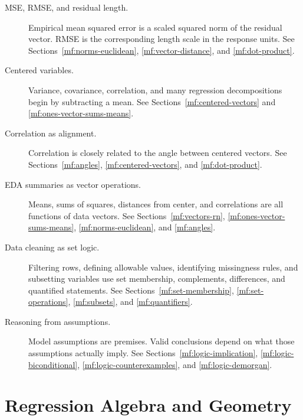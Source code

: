 \begin{description}
    \item[MSE, RMSE, and residual length.] Empirical mean squared error is a scaled squared norm of the residual vector. RMSE is the corresponding length scale in the response units. See Sections~\ref{mf:norms-euclidean}, \ref{mf:vector-distance}, and \ref{mf:dot-product}.

    \item[Centered variables.] Variance, covariance, correlation, and many regression decompositions begin by subtracting a mean. See Sections~\ref{mf:centered-vectors} and \ref{mf:ones-vector-sums-means}.

    \item[Correlation as alignment.] Correlation is closely related to the angle between centered vectors. See Sections~\ref{mf:angles}, \ref{mf:centered-vectors}, and \ref{mf:dot-product}.

    \item[EDA summaries as vector operations.] Means, sums of squares, distances from center, and correlations are all functions of data vectors. See Sections~\ref{mf:vectors-rn}, \ref{mf:ones-vector-sums-means}, \ref{mf:norms-euclidean}, and \ref{mf:angles}.

    \item[Data cleaning as set logic.] Filtering rows, defining allowable values, identifying missingness rules, and subsetting variables use set membership, complements, differences, and quantified statements. See Sections~\ref{mf:set-membership}, \ref{mf:set-operations}, \ref{mf:subsets}, and \ref{mf:quantifiers}.

    \item[Reasoning from assumptions.] Model assumptions are premises. Valid conclusions depend on what those assumptions actually imply. See Sections~\ref{mf:logic-implication}, \ref{mf:logic-biconditional}, \ref{mf:logic-counterexamples}, and \ref{mf:logic-demorgan}.
\end{description}

\section{Regression Algebra and Geometry}
\label{mf:da-bridge-regression-algebra-geometry}


